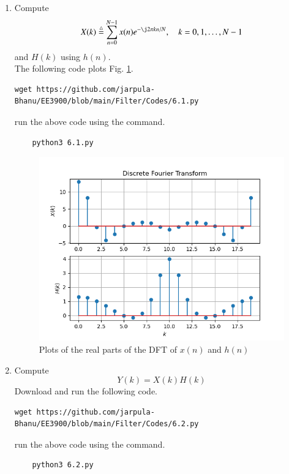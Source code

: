 \documentclass[journal,12pt,twocolumn]{IEEEtran}
\renewcommand\thesection{\arabic{section}}
\begin{document}
\begin{enumerate}[label=\thesection.\arabic*
,ref=\thesection.\theenumi]
\item
Compute
\begin{equation}
X(k) \define \sum _{n=0}^{N-1}x(n) e^{-\j2\pi kn/N}, \quad k = 0,1,\dots, N-1
\end{equation}
and $H(k)$ using $h(n)$.\\
\solution The following code plots Fig. \ref{fig:6.1}.
%
\begin{lstlisting}
wget https://github.com/jarpula-Bhanu/EE3900/blob/main/Filter/Codes/6.1.py
\end{lstlisting}
run the above code using the command.
\begin{lstlisting}
	python3 6.1.py
\end{lstlisting}
\begin{figure}[!ht]
\centering
\includegraphics[width=\columnwidth]{./figs/6.1.png}
\caption{Plots of the real parts of the DFT of $x(n)$ and $h(n)$}
\label{fig:6.1}
\end{figure}

\item Compute 
\begin{equation}\label{6.2}
Y(k) = X(k)H(k)
\end{equation}
\solution Download and run the following code.
%
\begin{lstlisting}
wget https://github.com/jarpula-Bhanu/EE3900/blob/main/Filter/Codes/6.2.py
\end{lstlisting}
run the above code using the command.
\begin{lstlisting}
	python3 6.2.py
\end{lstlisting}


\end{enumerate}
\end{document}
